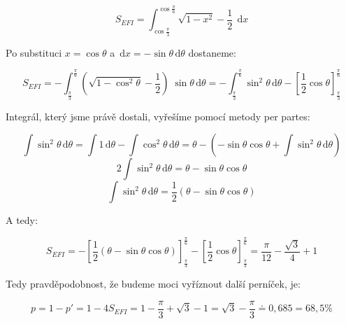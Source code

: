 \documentclass{fkssolpub}
\renewcommand{\d}{\, \mathrm{d}}
\begin{document}
\[
  S_{EFI} = \int_{\cos \frac{\pi}{3}}^{\cos \frac{\pi}{6}} \sqrt{1 - x^2} - \frac{1}{2} \; \d x
\]

Po substituci $x = \cos \theta$ a $\d x = - \sin \theta \d \theta$ dostaneme:

\[
  S_{EFI} = - \int_{\frac{\pi}{3}}^{\frac{\pi}{6}} \left( \sqrt{1 - \cos^2 \theta} - \frac{1}{2} \right) \; \sin \theta \d \theta = - \int_{\frac{\pi}{3}}^{\frac{\pi}{6}} \sin^2 \theta \d \theta - \left[ \frac{1}{2} \cos \theta \right]_{\frac{\pi}{3}}^{\frac{\pi}{6}}
\]

Integrál, který jsme právě dostali, vyřešíme pomocí metody per partes:

\[
  \int \sin^2 \theta \d \theta = \int 1 \d \theta - \int \cos^2 \theta \d \theta = \theta - \left(- \sin \theta \cos \theta + \int \sin^2 \theta \d \theta \right)
\]
\[
  2 \int \sin^2 \theta \d \theta = \theta - \sin \theta \cos \theta
\]
\[
  \int \sin^2 \theta \d \theta = \frac{1}{2} (\theta - \sin \theta \cos \theta)
\]

A tedy:

\[
  S_{EFI} = - \left[\frac{1}{2} (\theta - \sin \theta \cos \theta)\right]_{\frac{\pi}{3}}^{\frac{\pi}{6}} - \left[ \frac{1}{2} \cos \theta \right]_{\frac{\pi}{3}}^{\frac{\pi}{6}} = \frac{\pi}{12} - \frac{\sqrt{3}}{4} + 1
\]

Tedy pravděpodobnost, že budeme moci vyříznout další perníček, je:

\[
  p = 1 - p' = 1 - 4 S_{EFI} = 1 - \frac{\pi}{3} + \sqrt{3} - 1 = \sqrt{3} - \frac{\pi}{3} \doteq 0{,}685 = 68{,}5 \%
\]
\end{document}
